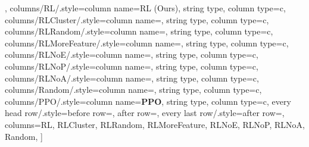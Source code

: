 \begin{table*}[ht]
{{            
        }
    },
    columns/RL/.style={column name={RL (Ours)}, string type, column type=c},
    columns/RLCluster/.style={column name={\rlcluster}, string type, column type=c},
    columns/RLRandom/.style={column name={\rlrandom}, string type, column type=c},
    columns/RLMoreFeature/.style={column name={\rlmorefeature}, string type, column type=c},
    columns/RLNoE/.style={column name={\rlnoe}, string type, column type=c},
    columns/RLNoP/.style={column name={\rlnop}, string type, column type=c},
    columns/RLNoA/.style={column name={\rlnoa}, string type, column type=c},
    columns/Random/.style={column name={\random}, string type, column type=c},
    columns/PPO/.style={column name={{\bf PPO}}, string type, column type=c},
    every head row/.style={before row=\toprule, after row=\midrule},
    every last row/.style={after row=\bottomrule},
    columns={RL, RLCluster, RLRandom, RLMoreFeature, RLNoE, RLNoP, RLNoA, Random}, %
]{\ablationtable}
\label{table:ablation}
\end{table*}
